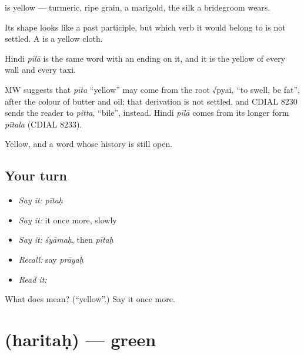 \textbf{} is yellow — turmeric, ripe grain, a marigold, the silk a bridegroom wears.

Its shape looks like a past participle, but which verb it would belong to is not settled. A \textbf{}  is a yellow cloth.

Hindi \emph{pīlā} is the same word with an ending on it, and it is the yellow of every wall and every taxi.

\begin{cousinweb}
MW suggests that \emph{pīta} \textquotedblleft{}yellow\textquotedblright{} may come from the root √pyai, \textquotedblleft{}to swell, be fat\textquotedblright{}, after the colour of butter and oil; that derivation is not settled, and CDIAL 8230 sends the reader to \emph{pitta}, \textquotedblleft{}bile\textquotedblright{}, instead. Hindi \emph{pīlā} comes from its longer form \emph{pītala} (CDIAL 8233).
\end{cousinweb}

\begin{grammarlens}[title={What you've built}]
Yellow, and a word whose history is still open.
\end{grammarlens}

\subsection*{Your turn}
\begin{itemize}
\raggedright
  \item \emph{Say it:} \emph{pītaḥ}
  \item \emph{Say it:} it once more, slowly
  \item \emph{Say it:} \emph{śyāmaḥ}, then \emph{pītaḥ}
  \item \emph{Recall:} say \emph{prāyaḥ}
  \item \emph{Read it:} \textbf{}
\end{itemize}

\begin{tcolorbox}[breakable,colback=teal!4,colframe=teal!35!black,title={Before you move on}]
What does  mean? (\textquotedblleft{}yellow\textquotedblright{}.) Say it once more.
\end{tcolorbox}
\section[\texorpdfstring{\sk{हरितः} (haritaḥ)}{हरितः (haritaḥ)}]{ (haritaḥ) — green}

